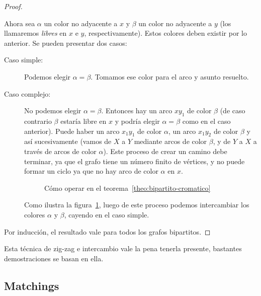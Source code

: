 \begin{proof}
\begin{description}
      Ahora sea \(\alpha\) un color no adyacente a \(x\)
      y \(\beta\) un color no adyacente a \(y\)
      (los llamaremos \emph{libres} en \(x\) e \(y\),
       respectivamente).
      Estos colores deben existir por lo anterior.
      Se pueden presentar dos casos:
      \begin{description}
	\item[Caso simple:]
	  Podemos elegir \(\alpha = \beta\).
	  Tomamos ese color para el arco y asunto resuelto.
	\item[Caso complejo:]
	  No podemos elegir \(\alpha = \beta\).
	  Entonces hay un arco \(x y_1\) de color \(\beta\)
	  (de caso contrario \(\beta\) estaría libre en \(x\)
	   y podría elegir \(\alpha = \beta\)
	   como en el caso anterior).
	  Puede haber un arco \(x_1 y_1\) de color \(\alpha\),
	  un arco \(x_1 y_2\) de color \(\beta\) y así sucesivamente
	  (vamos de \(X\) a \(Y\) mediante arcos de color \(\beta\),
	   y de \(Y\) a \(X\)
	   a través de arcos de color \(\alpha\)).
	  Este proceso de crear un camino debe terminar,
	  ya que el grafo tiene un número finito de vértices,
	  y no puede formar un ciclo
	  ya que no hay arco de color \(\alpha\)
	  en \(x\).
	  \begin{figure}[htbp]
	    \centering
	    \hspace*{4em}%
	    \caption{Cómo operar
		     en el teorema~\ref{theo:bipartito-cromatico}}
	    \label{fig:zig-zag}
	  \end{figure}
	  Como ilustra la figura~\ref{fig:zig-zag},
	  luego de este proceso
	  podemos intercambiar los colores \(\alpha\) y \(\beta\),
	  cayendo en el caso simple.
      \end{description}
    \end{description}
    Por inducción,
    el resultado vale para todos los grafos bipartitos.
  \end{proof}
  Esta técnica de zig-zag
  e intercambio vale la pena tenerla presente,
  bastantes demostraciones se basan en ella.

\subsection{Matchings}
\label{sec:matchings}


